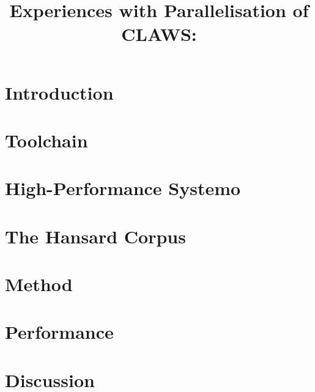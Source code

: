 \documentclass[10pt, a4paper]{article}
\title{Experiences with Parallelisation of CLAWS: }
\begin{document}
\maketitleabstract

\section{Introduction}


\section{Toolchain}





\section{High-Performance Systemo}



\section{The Hansard Corpus}



\section{Method}



\section{Performance}




\section{Discussion}









\end{document}
